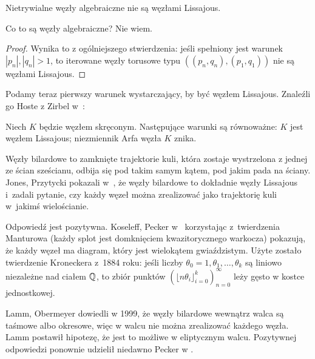\begin{corollary}
    Nietrywialne węzły algebraiczne nie są węzłami Lissajous.
\end{corollary}

Co to są węzły algebraiczne?
Nie wiem.

\begin{proof}
    Wynika to z ogólniejszego stwierdzenia: jeśli spełniony jest warunek $|p_n|, |q_n| > 1$, to iterowane węzły torusowe typu $((p_n, q_n), (p_1, q_1))$ nie są węzłami Lissajous.
\end{proof}

Podamy teraz pierwszy warunek wystarczający, by być węzłem Lissajous.
Znaleźli go Hoste z Zirbel w~\cite{zirbel06}:
%
%

\begin{proposition}
%
%
    Niech $K$ będzie węzłem skręconym.
    Następujące warunki są równoważne: $K$ jest węzłem Lissajous; niezmiennik Arfa węzła $K$ znika.
\end{proposition}

Węzły bilardowe to zamknięte trajektorie kuli, która zostaje wystrzelona z jednej ze ścian sześcianu, odbija się pod takim samym kątem, pod jakim pada na ściany.
%
Jones, Przytycki pokazali w~\cite{jones98}, że węzły bilardowe to dokładnie węzły Lissajous i~zadali pytanie, czy każdy węzeł można zrealizować jako trajektorię kuli w~jakimś wielościanie.
%
%

Odpowiedź jest pozytywna.
Koseleff, Pecker w~\cite{koseleff14} korzystając z~twierdzenia Manturowa
%
(każdy splot jest domknięciem kwazitorycznego warkocza)
pokazują, że każdy węzeł ma diagram, który jest wielokątem gwiaździstym.
Użyte zostało twierdzenie Kroneckera z~1884 roku: jeśli liczby $\theta_0 = 1, \theta_1, \ldots, \theta_k$ są liniowo niezależne nad ciałem $\mathbb Q$, to zbiór punktów $(\lfloor n\theta_i \rfloor_{i=0}^k)_{n=0}^\infty$ leży gęsto w kostce jednostkowej.

Lamm, Obermeyer dowiedli w 1999, że węzły bilardowe wewnątrz walca są taśmowe albo okresowe, więc w walcu nie można zrealizować każdego węzła.
%
%
Lamm postawił hipotezę, że jest to możliwe w eliptycznym walcu.
Pozytywnej odpowiedzi ponownie udzielił niedawno Pecker w \cite{pecker12}.



